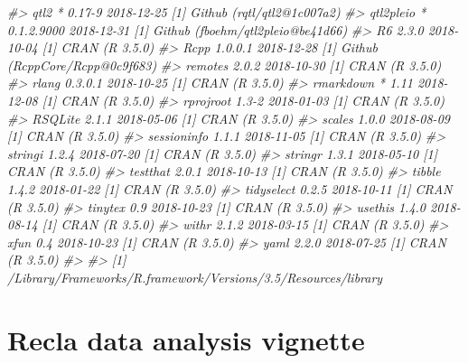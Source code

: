 \documentclass[oneside]{book}
\newenvironment{Shaded}{\begin{snugshade}}{\end{snugshade}}
\newcommand{\CommentTok}[1]{\textcolor[rgb]{0.56,0.35,0.01}{\textit{#1}}}
\newcommand{\DataTypeTok}[1]{\textcolor[rgb]{0.13,0.29,0.53}{#1}}
\newcommand{\DecValTok}[1]{\textcolor[rgb]{0.00,0.00,0.81}{#1}}
\newcommand{\KeywordTok}[1]{\textcolor[rgb]{0.13,0.29,0.53}{\textbf{#1}}}
\newcommand{\NormalTok}[1]{#1}
\newcommand{\OperatorTok}[1]{\textcolor[rgb]{0.81,0.36,0.00}{\textbf{#1}}}
\newcommand{\OtherTok}[1]{\textcolor[rgb]{0.56,0.35,0.01}{#1}}
\begin{document}
\begin{Shaded}
\begin{Highlighting}[]
\CommentTok{#>  qtl2        * 0.17-9     2018-12-25 [1] Github (rqtl/qtl2@1c007a2)       }
\CommentTok{#>  qtl2pleio   * 0.1.2.9000 2018-12-31 [1] Github (fboehm/qtl2pleio@be41d66)}
\CommentTok{#>  R6            2.3.0      2018-10-04 [1] CRAN (R 3.5.0)                   }
\CommentTok{#>  Rcpp          1.0.0.1    2018-12-28 [1] Github (RcppCore/Rcpp@0c9f683)   }
\CommentTok{#>  remotes       2.0.2      2018-10-30 [1] CRAN (R 3.5.0)                   }
\CommentTok{#>  rlang         0.3.0.1    2018-10-25 [1] CRAN (R 3.5.0)                   }
\CommentTok{#>  rmarkdown   * 1.11       2018-12-08 [1] CRAN (R 3.5.0)                   }
\CommentTok{#>  rprojroot     1.3-2      2018-01-03 [1] CRAN (R 3.5.0)                   }
\CommentTok{#>  RSQLite       2.1.1      2018-05-06 [1] CRAN (R 3.5.0)                   }
\CommentTok{#>  scales        1.0.0      2018-08-09 [1] CRAN (R 3.5.0)                   }
\CommentTok{#>  sessioninfo   1.1.1      2018-11-05 [1] CRAN (R 3.5.0)                   }
\CommentTok{#>  stringi       1.2.4      2018-07-20 [1] CRAN (R 3.5.0)                   }
\CommentTok{#>  stringr       1.3.1      2018-05-10 [1] CRAN (R 3.5.0)                   }
\CommentTok{#>  testthat      2.0.1      2018-10-13 [1] CRAN (R 3.5.0)                   }
\CommentTok{#>  tibble        1.4.2      2018-01-22 [1] CRAN (R 3.5.0)                   }
\CommentTok{#>  tidyselect    0.2.5      2018-10-11 [1] CRAN (R 3.5.0)                   }
\CommentTok{#>  tinytex       0.9        2018-10-23 [1] CRAN (R 3.5.0)                   }
\CommentTok{#>  usethis       1.4.0      2018-08-14 [1] CRAN (R 3.5.0)                   }
\CommentTok{#>  withr         2.1.2      2018-03-15 [1] CRAN (R 3.5.0)                   }
\CommentTok{#>  xfun          0.4        2018-10-23 [1] CRAN (R 3.5.0)                   }
\CommentTok{#>  yaml          2.2.0      2018-07-25 [1] CRAN (R 3.5.0)                   }
\CommentTok{#> }
\CommentTok{#> [1] /Library/Frameworks/R.framework/Versions/3.5/Resources/library}
\end{Highlighting}
\end{Shaded}
\section{Recla data analysis vignette}
\begin{Shaded}
\end{Shaded}
\end{document}
